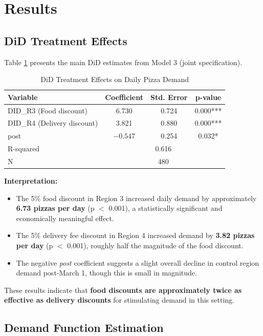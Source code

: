 \documentclass[12pt]{article}
\begin{document}
\section{Results}

\subsection{DiD Treatment Effects}

Table \ref{tab:did_results} presents the main DiD estimates from Model 3 (joint specification).

\begin{table}[H]
\centering
\caption{DiD Treatment Effects on Daily Pizza Demand}
\label{tab:did_results}
\begin{tabular}{lccc}
\toprule
\textbf{Variable} & \textbf{Coefficient} & \textbf{Std. Error} & \textbf{p-value} \\
\midrule
DID\_R3 (Food discount) & 6.730 & 0.724 & 0.000*** \\
DID\_R4 (Delivery discount) & 3.821 & 0.880 & 0.000*** \\
post & $-0.547$ & 0.254 & 0.032* \\
\midrule
R-squared & \multicolumn{3}{c}{0.616} \\
N & \multicolumn{3}{c}{480} \\
\bottomrule
\end{tabular}
\end{table}

\textbf{Interpretation:}
\begin{itemize}[nosep]
    \item The 5\% food discount in Region 3 increased daily demand by approximately \textbf{6.73 pizzas per day} (p $<$ 0.001), a statistically significant and economically meaningful effect.
    \item The 5\% delivery fee discount in Region 4 increased demand by \textbf{3.82 pizzas per day} (p $<$ 0.001), roughly half the magnitude of the food discount.
    \item The negative \textit{post} coefficient suggests a slight overall decline in control region demand post-March 1, though this is small in magnitude.
\end{itemize}

These results indicate that \textbf{food discounts are approximately twice as effective as delivery discounts} for stimulating demand in this setting.

\subsection{Demand Function Estimation}
\end{document}
